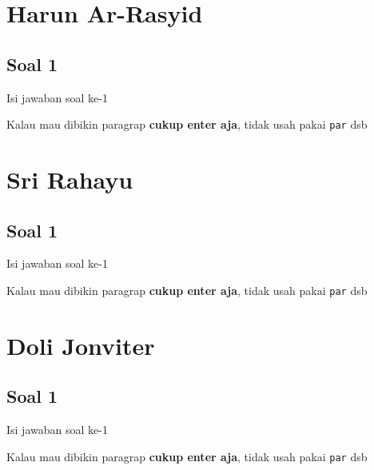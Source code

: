 \section{Harun Ar-Rasyid}
\subsection{Soal 1}
Isi jawaban soal ke-1

Kalau mau dibikin paragrap \textbf{cukup enter aja}, tidak usah pakai \verb|par| dsb



\section{Sri Rahayu}
\subsection{Soal 1}
Isi jawaban soal ke-1

Kalau mau dibikin paragrap \textbf{cukup enter aja}, tidak usah pakai \verb|par| dsb



\section{Doli Jonviter}
\subsection{Soal 1}
Isi jawaban soal ke-1

Kalau mau dibikin paragrap \textbf{cukup enter aja}, tidak usah pakai \verb|par| dsb

